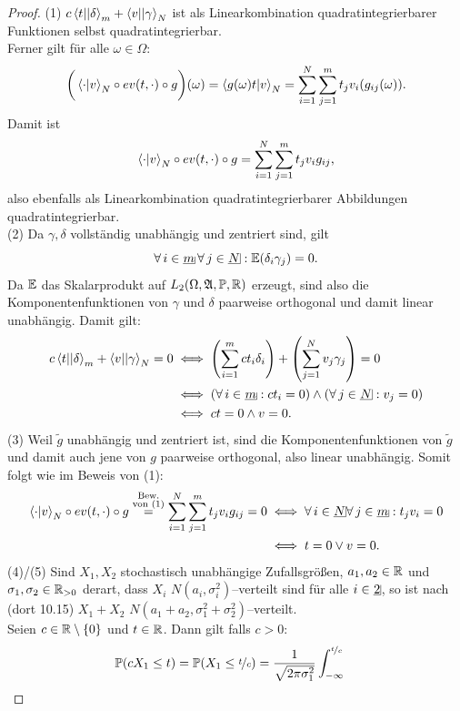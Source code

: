 \begin{proof}
(1) $c\left\langle t ||\delta\right\rangle_m + \left\langle v ||\gamma\right\rangle_N$ ist als Linearkombination
quadratintegrierbarer Funktionen selbst quadratintegrierbar.\\
Ferner gilt für alle $\omega \in \Omega$:
\[\bigg(\left\langle \cdot |v\right\rangle_N \circ ev(t, \cdot) \circ g\bigg)(\omega) =
\left\langle g(\omega)t |v\right\rangle_N = \sum_{i=1}^N\sum_{j=1}^mt_jv_i(g_{ij}(\omega))\text.\]
Damit ist\[
\left\langle \cdot |v\right\rangle_N\circ ev(t,\cdot)\circ g=\sum_{i=1}^N\sum_{j=1}^mt_jv_ig_{ij}
\text,\]
also ebenfalls als Linearkombination quadratintegrierbarer Abbildungen
quadratintegrierbar.\\
(2) Da $\gamma, \delta$ vollständig unabhängig und zentriert sind, gilt
\[\forall\,i\in\haken m\,\forall\,j\in\haken N:\E(\delta_i\gamma_j)=0\text.\]
Da $\mathbb{E}$ das Skalarprodukt auf $L_2(\Omega, \mathfrak{A}, \mathbb{P}, \mathbb{R})$ erzeugt, sind also
die Komponentenfunktionen von $\gamma$ und $\delta$ paarweise orthogonal und
damit linear unabhängig. Damit gilt:
\begin{align*}
c\bprod t \delta _m + \bprod v \gamma_N = 0 
& \iff \left(\sum_{i=1}^mct_i\delta_i \right) 
     + \left(\sum_{j=1}^Nv_j\gamma_j \right) = 0\\
& \iff(\forall\,i\in \haken m: ct_i = 0) \wedge (\forall\,j\in\haken N:v_j=0)\\
& \iff ct = 0 \wedge v = 0\text.
\end{align*}
(3) Weil $\widetilde g$ unabhängig und zentriert ist, sind die
Komponentenfunktionen von $\widetilde g$ und damit auch jene von $g$ paarweise
orthogonal, also linear unabhängig. Somit folgt wie im Beweis von (1):
\begin{align*}
 \sprod \cdot v_N \circ ev(t, \cdot) \circ g 
 \overset{\substack{\text{Bew.}\\ \text{von }(1)}}=
  \sum_{i=1}^N\sum_{j=1}^mt_jv_ig_{ij} = 0
&\iff \forall\, i \in \haken N \forall\, j \in \haken m: t_jv_i = 0\\
& \iff  t= 0 \vee v = 0\text.
\end{align*}
(4)/(5) Sind $X_1,X_2$ stochastisch unabhängige Zufallsgrößen, $a_1,a_2\in \mathbb{R}$
und $\sigma_1,\sigma_2\in\mathbb{R}_{>0}$ derart, dass $X_i$
$N(a_i,\sigma_i^2)$--verteilt sind für alle $i \in \haken 2$, so ist nach~\cite{Irle} (dort 10.15) $X_1 + X_2$
$N(a_1+a_2, \sigma_1^2 + \sigma_2^2)$--verteilt.\\
Seien $c\in \mathbb{R}\setminus\left\{0\right\}$ und $t \in \mathbb{R}$. Dann gilt falls $c > 0$:
\begin{align*}
\Prim(cX_1 \le t) &= \Prim(X_1 \le \nicefrac t c) 
= \frac 1{\sqrt{2\pi\sigma_1^2}}\int_{-\infty}^{\nicefrac t c}

\end{align*}
\end{proof}
